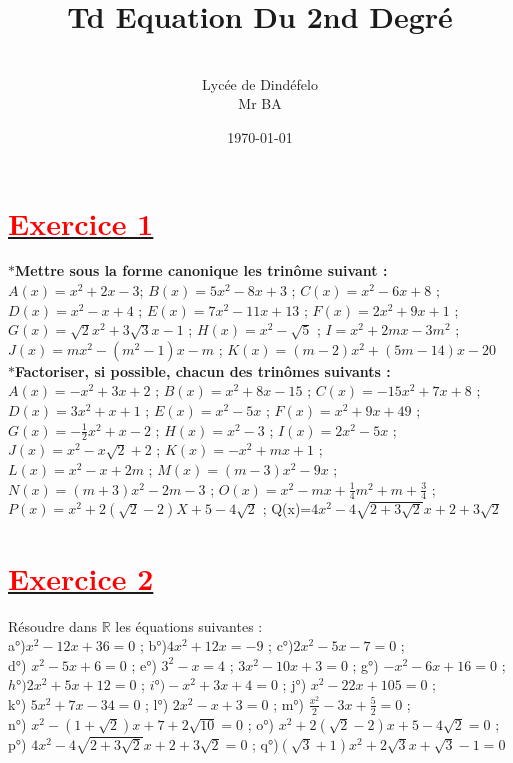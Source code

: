 \documentclass[12pt]{article}
\author{\\Lycée de Dindéfelo\\Mr BA}
\title{\textbf{Td Equation Du 2nd Degré}}
\date{\today}
\begin{document}
\maketitle
\newpage
\section*{\underline{\textbf{\textcolor{red}{Exercice 1}}}}
$\ast$\textbf{Mettre sous la forme canonique les trinôme suivant :} \\
$A(x)=x^{2}+2x-3$\quad ; $B(x) = 5x^{2}-8x+3$ ; $C(x) =x^{2}-6x+8$ ; $D(x) =x^{2}-x+4$ ; 
$E(x) = 7x^{2}-11x + 13$ ; $F(x) = 2x^{2}+9x+1$ ; $G(x) =\sqrt{2}x^{2}+3\sqrt{3}x-1$ ; 
$H(x) =x^{2}-\sqrt{5}$ ; $I =x^{2} + 2mx-3m^{2}$ ;$J(x) =mx^{2}-(m^{2}-1)x-m$ ; 
$K(x) =(m-2)x^{2}+(5m-14)x-20$\\
$\ast$\textbf{Factoriser, si possible, chacun des trinômes suivants :} \\
$A(x)=-x^{2}+3x+2$ ; $B(x)=x^{2}+8x-15$ ; $C(x)=-15x^{2}+7x+8$ ; $D(x)=3x^{2}+x+1$ ; $E(x)=x^{2}-5x$ ; $F(x) =x^{2}+9x+49$ ; $G(x) =-\frac{1}{2}x^{2}+x-2$ ; $H(x) =x^{2}-3$ ;
$I(x) =2x^{2}-5x$ ; $J(x) =x^{2}-x\sqrt{2}+2$ ; $K(x) =-x^{2}+mx+1$ ;\\ $L(x) =x^{2}-x+2m$ ; $M(x)=(m-3)x^{2}-9x$ ; $N(x) =(m+3)x^{2}-2m-3$ ;
$O(x)=x^{2}-mx +\frac{1}{4}m^{2}+m+\frac{3}{4}$ ; $P(x)= x^{2} + 2(\sqrt{2}-2)X+5-4\sqrt{2}$ ; Q(x)=$4x^{2}-4\sqrt{2+3\sqrt{2}}x+2+3\sqrt{2}$
\section*{\underline{\textbf{\textcolor{red}{Exercice 2}}}}
Résoudre dans $\mathbb{R}$ les équations suivantes :\\
a°)$x^{2}-12x+36=0$ ; b°)$4x^{2}+12x=-9$ ; c°)$2x^{2}-5x-7=0$ ;\\ d°) $x^{2}-5x+6=0$ ; e°) $3^{2}-x=4$ ; 
$3x^{2}-10x+3=0$ ; g°) $-x^{2}-6x+16=0$ ; $h°)2x^{2}+5x+12=0$ ; $i°)-x^{2}+3x+4=0$ ; j°) $x^{2}-22x+105 = 0$ ;\\ k°) $5x^{2}+7x-34=0$ ; l°) $2x^{2}-x+3=0$ ; 
m°) $\frac{x^{2}}{2}-3x+\frac{5}{2}=0$ ;\\ n°) $x^{2}-(1+\sqrt{2})x+7+2\sqrt{10}=0$ ;
o°) $x^{2}+2(\sqrt{2}-2)x+5-4\sqrt{2}=0$ ;\\p°) $4x^{2}-4\sqrt{2+3\sqrt{2}}x+2+3\sqrt{2}=0$ ; q°)$(\sqrt{3}+1)x^{2} +2\sqrt{3}x+\sqrt{3}-1=0$
\end{document}
